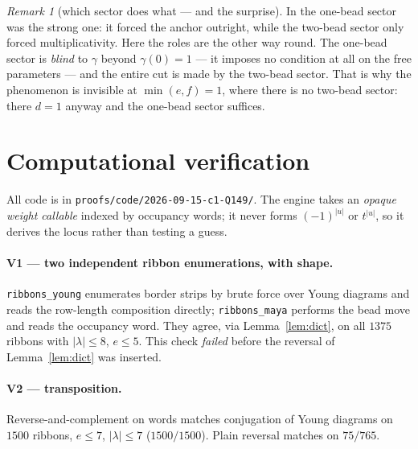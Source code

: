 \documentclass[11pt]{article}
\theoremstyle{definition}
\theoremstyle{remark}
\newtheorem{remark}[theorem]{Remark}
\begin{document}
\begin{remark}[which sector does what --- and the surprise]
In \cite{Q147} the one-bead sector was the strong one: it forced the anchor outright,
while the two-bead sector only forced multiplicativity.  Here the roles are the other way
round.  The one-bead sector is \emph{blind} to $\gamma$ beyond $\gamma(0)=1$ --- it
imposes no condition at all on the free parameters --- and the entire cut is made by the
two-bead sector.  That is why the phenomenon is invisible at $\min(e,f)=1$, where there
is no two-bead sector: there $d=1$ anyway and the one-bead sector suffices.
\end{remark}

\section{Computational verification}\label{sec:ver}

All code is in \verb|proofs/code/2026-09-15-c1-Q149/|.  The engine takes an
\emph{opaque weight callable} indexed by occupancy words; it never forms $(-1)^{|u|}$ or
$t^{|u|}$, so it derives the locus rather than testing a guess.

\paragraph{V1 --- two independent ribbon enumerations, with shape.}
\verb|ribbons_young| enumerates border strips by brute force over Young diagrams and
reads the row-length composition directly; \verb|ribbons_maya| performs the bead move and
reads the occupancy word.  They agree, via Lemma~\ref{lem:dict}, on all $1375$ ribbons
with $|\lambda|\le8$, $e\le5$.  This check \emph{failed} before the reversal of
Lemma~\ref{lem:dict} was inserted.

\paragraph{V2 --- transposition.}  Reverse-and-complement on words matches conjugation of
Young diagrams on $1500$ ribbons, $e\le7$, $|\lambda|\le7$ ($1500/1500$).  Plain reversal
matches on $75/765$.
\end{document}
